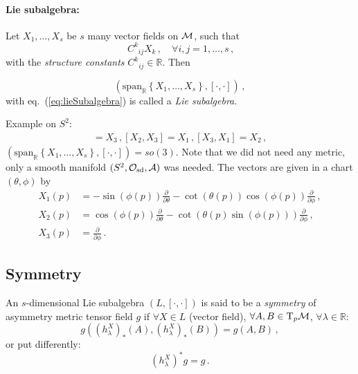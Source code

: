\documentclass[11pt, a4paper, twocolumn]{article} %
\begin{document}
    \paragraph{Lie subalgebra:}
    Let $X_1, \ldots, X_s$ be $s$ many vector fields on $\mathcal{M}$, such that
    \begin{equation}
        [X_i, X_j] \ C^k{}_{ij} X_k\,,\quad\forall i,j=1,\ldots,s\,,
        \label{eq:lieSubalgebra}
    \end{equation}
    with the \textit{structure constants} $C^k{}_{ij}\in\mathbb{R}$.
    Then
    \begin{defn}
        \begin{equation}
            (\mathrm{span}_\mathbb{R}\left\{ X_1,\ldots,X_s \right\}, [\cdot,\cdot])\,,
        \end{equation}
        with eq.~(\ref{eq:lieSubalgebra}) is called a \textit{Lie subalgebra}.
    \end{defn}
    Example on $S^2$:
    \begin{align*}
        [X_1, X_2] = X_3\,,
        [X_2, X_3] = X_1\,,
        [X_3, X_1] = X_2\,,
    \end{align*}
    $(\mathrm{span}_\mathbb{R}\left\{ X_1,\ldots,X_s \right\}, [\cdot,\cdot])=so(3)$.
    Note that we did not need any metric, only a smooth manifold $(S^2, \mathcal{O}_\text{sd}, \mathcal{A})$ was needed.
    The vectors are given in a chart $(\theta, \phi)$ by
    \begin{align*}
        X_1(p) &=  -\sin\left( \phi(p) \right)\frac{\partial}{\partial \theta} -
        \cot\left( \theta(p) \right) \cos\left( \phi(p) \right)\frac{\partial}{\partial \phi}\,,\\
        X_2(p) &= \cos\left( \phi(p) \right)\frac{\partial}{\partial \theta} - 
        \cot\left( \theta(p) \sin\left( \phi(p) \right) \right)\frac{\partial}{\partial \phi}\,,\\
        X_3(p) &= \frac{\partial}{\partial \phi}\,.
    \end{align*}

    \subsection{Symmetry}
    \begin{defn}
        An $s$-dimensional Lie subalgebra $(L, [\cdot,\cdot])$ is said to be a
        \textit{symmetry} of asymmetry metric tensor field $g$ if
        $\forall X\in L$ (vector field), $\forall A,B \in \T_p\M$,
        $\forall \lambda \in \mathbb{R}$:
        \begin{equation}
            g\left( (h^X_\lambda)_* (A), (h^X_\lambda)_*(B) \right) = g(A,B)\,,
        \end{equation}
        or put differently:
        \begin{equation}
            (h^X_\lambda)^* g = g\,.
        \end{equation}
    \end{defn}
\end{document}
